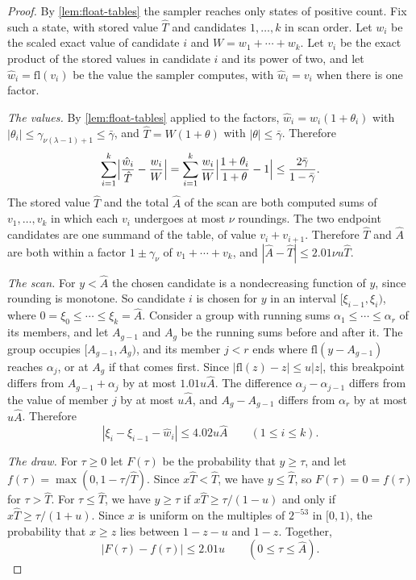 \documentclass[11pt,reqno]{amsart}
\theoremstyle{definition}
\theoremstyle{remark}
\begin{document}
\begin{proof}
By \cref{lem:float-tables} the sampler reaches only states of positive
count.  Fix such a state, with stored value $\hat T$ and candidates
$1,\ldots,k$ in scan order.  Let $w_i$ be the scaled exact value of
candidate $i$ and $W=w_1+\cdots+w_k$.  Let $v_i$ be the exact product of the
stored values in candidate $i$ and its power of two, and let
$\hat w_i=\mathrm{fl}(v_i)$ be the value the sampler computes, with
$\hat w_i=v_i$ when there is one factor.

\emph{The values.}  By \cref{lem:float-tables} applied to the factors,
$\hat w_i=w_i(1+\theta_i)$ with
$|\theta_i|\leq\gamma_{\nu(\lambda-1)+1}\leq\bar\gamma$, and
$\hat T=W(1+\theta)$ with $|\theta|\leq\bar\gamma$.  Therefore
\begin{equation}\label{eq:float-values}
 \sum_{i=1}^k\Bigl|\frac{\hat w_i}{\hat T}-\frac{w_i}{W}\Bigr|
 =\sum_{i=1}^k\frac{w_i}{W}\Bigl|\frac{1+\theta_i}{1+\theta}-1\Bigr|
 \leq\frac{2\bar\gamma}{1-\bar\gamma}.
\end{equation}
The stored value $\hat T$ and the total $\hat A$ of the scan are both
computed sums of $v_1,\ldots,v_k$ in which each $v_i$ undergoes at most
$\nu$ roundings.  The two endpoint candidates are one summand of the
table, of value $v_i+v_{i+1}$.  Therefore $\hat T$ and $\hat A$ are both
within a factor $1\pm\gamma_\nu$ of $v_1+\cdots+v_k$, and
$|\hat A-\hat T|\leq2.01\nu u\hat T$.

\emph{The scan.}  For $y<\hat A$ the chosen candidate is a nondecreasing
function of $y$, since rounding is monotone.  So candidate $i$ is chosen for
$y$ in an interval $[\xi_{i-1},\xi_i)$, where
$0=\xi_0\leq\cdots\leq\xi_k=\hat A$.  Consider a group with running sums
$\alpha_1\leq\cdots\leq\alpha_r$ of its members, and let $A_{g-1}$ and $A_g$
be the running sums before and after it.  The group occupies
$[A_{g-1},A_g)$, and its member $j<r$ ends where
$\mathrm{fl}(y-A_{g-1})$ reaches $\alpha_j$, or at $A_g$ if that comes first.
Since $|\mathrm{fl}(z)-z|\leq u|z|$, this breakpoint differs from
$A_{g-1}+\alpha_j$ by at most $1.01u\hat A$.  The difference
$\alpha_j-\alpha_{j-1}$ differs from the value of member $j$ by at most
$u\hat A$, and $A_g-A_{g-1}$ differs from $\alpha_r$ by at most $u\hat A$.
Therefore
\begin{equation}\label{eq:float-scan}
 |\xi_i-\xi_{i-1}-\hat w_i|\leq4.02u\hat A\qquad(1\leq i\leq k).
\end{equation}

\emph{The draw.}  For $\tau\geq0$ let $F(\tau)$ be the probability that
$y\geq\tau$, and let $f(\tau)=\max(0,1-\tau/\hat T)$.  Since
$x\hat T<\hat T$, we have $y\leq\hat T$, so $F(\tau)=0=f(\tau)$ for
$\tau>\hat T$.  For $\tau\leq\hat T$, we have $y\geq\tau$ if
$x\hat T\geq\tau/(1-u)$ and only if $x\hat T\geq\tau/(1+u)$.  Since $x$ is
uniform on the multiples of $2^{-53}$ in $[0,1)$, the probability that
$x\geq z$ lies between $1-z-u$ and $1-z$.  Together,
\begin{equation}\label{eq:float-draw}
 |F(\tau)-f(\tau)|\leq2.01u\qquad(0\leq\tau\leq\hat A).
\end{equation}


\end{proof}
\end{document}
